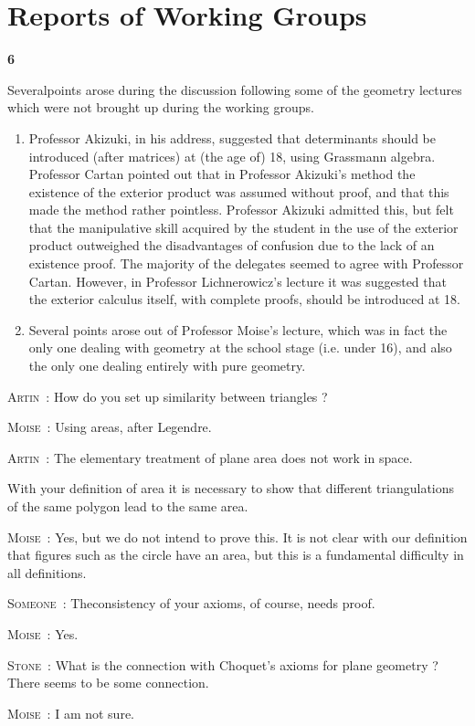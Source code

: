 \chapter{Reports of Working Groups}

\begin{center}
{\large\bf 6}
\end{center}
\medskip

\setcounter{pageoriginal}{200}
Several\pageoriginale points arose during the discussion following some of the geometry lectures which were not brought up during the working groups.
\begin{enumerate}
\item Professor Akizuki, in his address, suggested that determinants should be introduced (after matrices) at (the age of) 18, using Grassmann algebra. Professor Cartan pointed out that in Professor Akizuki's method the existence of the exterior product was assumed without proof, and that this made the method rather pointless. Professor Akizuki admitted this, but felt that the manipulative skill acquired by the student in the use of the exterior product outweighed the disadvantages of confusion due to the lack of an existence proof. The majority of the delegates seemed to agree with Professor Cartan. However, in Professor Lichnerowicz's lecture it was suggested that the exterior calculus itself, with complete proofs, should be introduced at 18.

\item Several points arose out of Professor Moise's lecture, which was in fact the only one dealing with geometry at the school stage (i.e. under 16), and also the only one dealing entirely with pure geometry.
\end{enumerate}

\smallskip
\noindent
\textsc{Artin}~: How do you set up similarity between triangles ?

\smallskip
\noindent
\textsc{Moise}~: Using areas, after Legendre.

\smallskip
\noindent
\textsc{Artin}~: The elementary treatment of plane area does not work in space.

With your definition of area it is necessary to show that different triangulations of the same polygon lead to the same area.

\smallskip
\noindent
\textsc{Moise}~: Yes, but we do not intend to prove this. It is not clear with our definition that figures such as the circle have an area, but this is a fundamental difficulty in all definitions.

\smallskip
\noindent
\textsc{Someone}~: The\pageoriginale consistency of your axioms, of course, needs proof.

\smallskip
\noindent
\textsc{Moise}~: Yes.

\smallskip
\noindent
\textsc{Stone}~: What is the connection with Choquet's axioms for plane geometry ? There seems to be some connection.

\smallskip
\noindent
\textsc{Moise}~: I am not sure.
